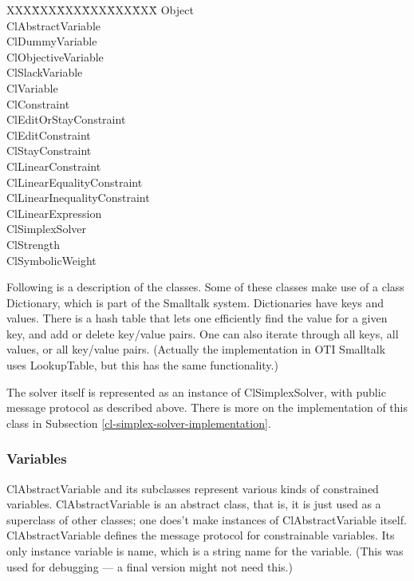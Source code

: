 \documentclass{article}
\begin{document}
\begin{tabbing}
XXX\=XXX\=XXX\=XXX\=XXX\=XXX\=   \kill
\> {\sf Object} \\
\> \> {\sf ClAbstractVariable} \\
\> \> \> {\sf ClDummyVariable} \\
\> \> \> {\sf ClObjectiveVariable} \\
\> \> \> {\sf ClSlackVariable} \\
\> \> \> {\sf ClVariable} \\
\> \> {\sf ClConstraint} \\
\> \> \> {\sf ClEditOrStayConstraint} \\
\> \> \> \> {\sf ClEditConstraint} \\
\> \> \> \> {\sf ClStayConstraint} \\
\> \> \> {\sf ClLinearConstraint} \\
\> \> \> \> {\sf ClLinearEqualityConstraint} \\
\> \> \> \> {\sf ClLinearInequalityConstraint} \\
\> \> {\sf ClLinearExpression} \\
\> \> {\sf ClSimplexSolver} \\
\> \> {\sf ClStrength} \\
\> \> {\sf ClSymbolicWeight}
\end{tabbing}

Following is a description of the classes.  Some of these classes make use
of a class {\sf Dictionary}, which is part of the Smalltalk system.
Dictionaries have keys and values.  There is a hash table that lets one
efficiently find the value for a given key, and add or delete key/value
pairs.  One can also iterate through all keys, all values, or all key/value
pairs.  (Actually the implementation in OTI Smalltalk uses {\sf
LookupTable}, but this has the same functionality.)

The solver itself is represented as an instance of {\sf ClSimplexSolver},
with public message protocol as described above.  There is more on the
implementation of this class in Subsection 
\ref{cl-simplex-solver-implementation}.

\subsubsection{Variables}

{\sf ClAbstractVariable} and its subclasses represent various kinds of
constrained variables.  {\sf ClAbstractVariable} is an abstract class, that
is, it is just used as a superclass of other classes; one does't make
instances of {\sf ClAbstractVariable} itself.  {\sf ClAbstractVariable}
defines the message protocol for constrainable variables.  Its only
instance variable is {\sf name}, which is a string name for the variable.
(This was used for debugging --- a final version might not need this.)
\end{document}
